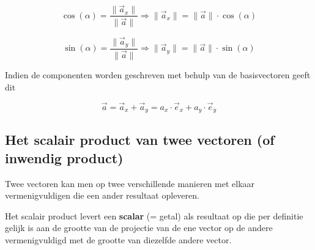 \documentclass{ximera}
\begin{document}
\[
\cos(\alpha) = \frac{\| \vec{a}_x \|}{\| \vec{a} \|} \Rightarrow \| \vec{a}_x \| = \|\vec{a}\| \cdot \cos(\alpha)
\]

\[
\sin(\alpha) = \frac{\| \vec{a}_y \|}{\| \vec{a} \|} \Rightarrow \| \vec{a}_y \| = \|\vec{a}\| \cdot \sin(\alpha)
\]

\begin{image}[0.3\textwidth]
\end{image}

Indien de componenten worden geschreven met behulp van de basisvectoren geeft dit 


$$
\vec{a} = \vec{a}_x + \vec{a}_y = a_x \cdot \vec{e}_x + a_y \cdot \vec{e}_y 
$$


\subsection*{Het scalair product van twee vectoren (of inwendig product)}

Twee vectoren kan men op twee verschillende manieren met elkaar vermenigvuldigen die een ander resultaat opleveren. 

Het scalair product levert een \textbf{scalar} (= getal) als resultaat op die per definitie gelijk is aan de grootte van de projectie van de ene vector op de andere vermenigvuldigd met de grootte van diezelfde andere vector. 
\end{document}
